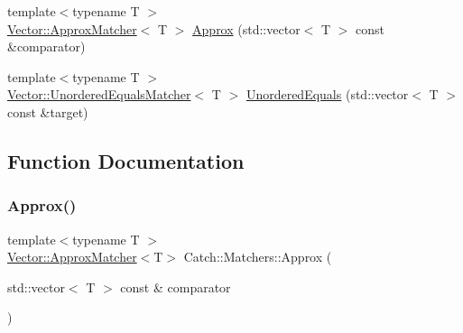 \begin{DoxyCompactItemize}
\item 
{\footnotesize template$<$typename T $>$ }\\\mbox{\hyperlink{struct_catch_1_1_matchers_1_1_vector_1_1_approx_matcher}{Vector\+::\+Approx\+Matcher}}$<$ T $>$ \mbox{\hyperlink{namespace_catch_1_1_matchers_af5b9fe04e095ee688e4058ab27b92e04}{Approx}} (std\+::vector$<$ T $>$ const \&comparator)
\item 
{\footnotesize template$<$typename T $>$ }\\\mbox{\hyperlink{struct_catch_1_1_matchers_1_1_vector_1_1_unordered_equals_matcher}{Vector\+::\+Unordered\+Equals\+Matcher}}$<$ T $>$ \mbox{\hyperlink{namespace_catch_1_1_matchers_a3eced3a4f580478f4c5e67ed7e2915df}{Unordered\+Equals}} (std\+::vector$<$ T $>$ const \&target)
\end{DoxyCompactItemize}


\subsection{Function Documentation}
\mbox{\label{namespace_catch_1_1_matchers_af5b9fe04e095ee688e4058ab27b92e04}} 
\subsubsection{\texorpdfstring{Approx()}{Approx()}}
{\footnotesize\ttfamily template$<$typename T $>$ \\
\mbox{\hyperlink{struct_catch_1_1_matchers_1_1_vector_1_1_approx_matcher}{Vector\+::\+Approx\+Matcher}}$<$T$>$ Catch\+::\+Matchers\+::\+Approx (\begin{DoxyParamCaption}\item[{std\+::vector$<$ T $>$ const \&}]{comparator }\end{DoxyParamCaption})}

\mbox{\label{namespace_catch_1_1_matchers_a1f6c2accdc6cd75a84d7112dcad647b4}} 
